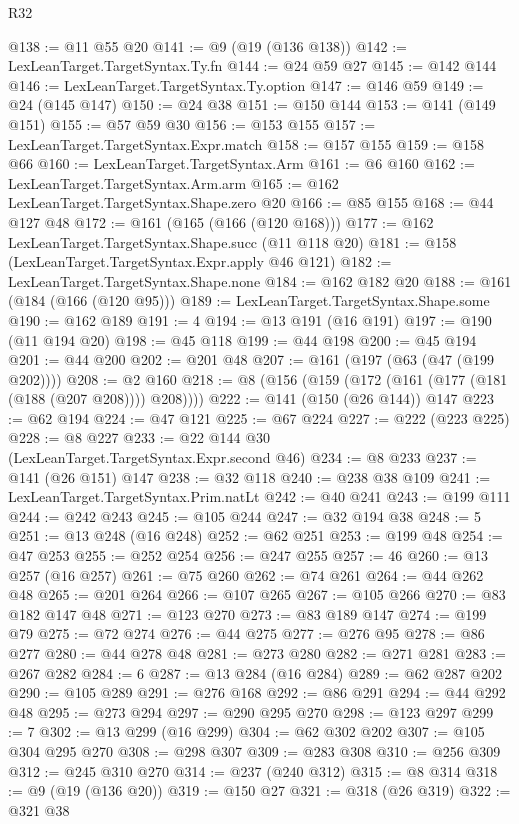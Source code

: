 \begin{lexlean}{R32}
\begin{coremodule}
@138 := @11 @55 @20
@141 := @9 (@19 (@136 @138))
@142 := LexLeanTarget.TargetSyntax.Ty.fn
@144 := @24 @59 @27
@145 := @142 @144
@146 := LexLeanTarget.TargetSyntax.Ty.option
@147 := @146 @59
@149 := @24 (@145 @147)
@150 := @24 @38
@151 := @150 @144
@153 := @141 (@149 @151)
@155 := @57 @59 @30
@156 := @153 @155
@157 := LexLeanTarget.TargetSyntax.Expr.match
@158 := @157 @155
@159 := @158 @66
@160 := LexLeanTarget.TargetSyntax.Arm
@161 := @6 @160
@162 := LexLeanTarget.TargetSyntax.Arm.arm
@165 := @162 LexLeanTarget.TargetSyntax.Shape.zero @20
@166 := @85 @155
@168 := @44 @127 @48
@172 := @161 (@165 (@166 (@120 @168)))
@177 := @162 LexLeanTarget.TargetSyntax.Shape.succ (@11 @118 @20)
@181 := @158 (LexLeanTarget.TargetSyntax.Expr.apply @46 @121)
@182 := LexLeanTarget.TargetSyntax.Shape.none
@184 := @162 @182 @20
@188 := @161 (@184 (@166 (@120 @95)))
@189 := LexLeanTarget.TargetSyntax.Shape.some
@190 := @162 @189
@191 := 4
@194 := @13 @191 (@16 @191)
@197 := @190 (@11 @194 @20)
@198 := @45 @118
@199 := @44 @198
@200 := @45 @194
@201 := @44 @200
@202 := @201 @48
@207 := @161 (@197 (@63 (@47 (@199 @202))))
@208 := @2 @160
@218 := @8 (@156 (@159 (@172 (@161 (@177 (@181 (@188 (@207 @208)))) @208))))
@222 := @141 (@150 (@26 @144)) @147
@223 := @62 @194
@224 := @47 @121
@225 := @67 @224
@227 := @222 (@223 @225)
@228 := @8 @227
@233 := @22 @144 @30 (LexLeanTarget.TargetSyntax.Expr.second @46)
@234 := @8 @233
@237 := @141 (@26 @151) @147
@238 := @32 @118
@240 := @238 @38 @109
@241 := LexLeanTarget.TargetSyntax.Prim.natLt
@242 := @40 @241
@243 := @199 @111
@244 := @242 @243
@245 := @105 @244
@247 := @32 @194 @38
@248 := 5
@251 := @13 @248 (@16 @248)
@252 := @62 @251
@253 := @199 @48
@254 := @47 @253
@255 := @252 @254
@256 := @247 @255
@257 := 46
@260 := @13 @257 (@16 @257)
@261 := @75 @260
@262 := @74 @261
@264 := @44 @262 @48
@265 := @201 @264
@266 := @107 @265
@267 := @105 @266
@270 := @83 @182 @147 @48
@271 := @123 @270
@273 := @83 @189 @147
@274 := @199 @79
@275 := @72 @274
@276 := @44 @275
@277 := @276 @95
@278 := @86 @277
@280 := @44 @278 @48
@281 := @273 @280
@282 := @271 @281
@283 := @267 @282
@284 := 6
@287 := @13 @284 (@16 @284)
@289 := @62 @287 @202
@290 := @105 @289
@291 := @276 @168
@292 := @86 @291
@294 := @44 @292 @48
@295 := @273 @294
@297 := @290 @295 @270
@298 := @123 @297
@299 := 7
@302 := @13 @299 (@16 @299)
@304 := @62 @302 @202
@307 := @105 @304 @295 @270
@308 := @298 @307
@309 := @283 @308
@310 := @256 @309
@312 := @245 @310 @270
@314 := @237 (@240 @312)
@315 := @8 @314
@318 := @9 (@19 (@136 @20))
@319 := @150 @27
@321 := @318 (@26 @319)
@322 := @321 @38

\end{coremodule}
\end{lexlean}

